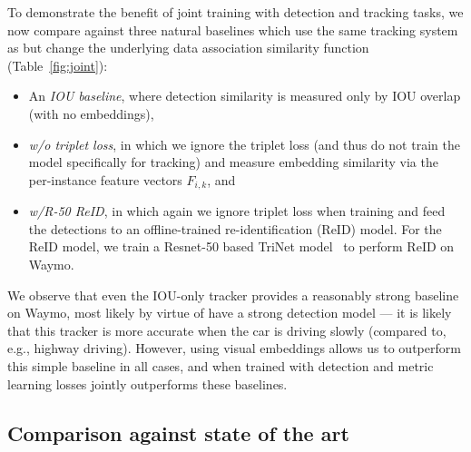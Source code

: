 To demonstrate the benefit of joint training with detection and 
tracking tasks, we now compare \modelname against three natural baselines
which use the same tracking system as \modelname but change the underlying
data association similarity function
(Table~\ref{fig:joint}):
\vspace{-2mm}
\begin{itemize}\denselist
    \item An \emph{IOU baseline}, where  detection similarity
is measured only by IOU overlap  (with no embeddings),
    \item \emph{\modelname w/o triplet loss}, in which we ignore
the triplet loss (and thus do not train the model specifically for tracking) 
and measure
embedding similarity via the per-instance
feature vectors $F_{i,k}$, and
    \item \emph{\modelname w/R-50 ReID}, in which again we ignore
triplet loss when training \modelname and feed the detections
to an offline-trained re-identification (ReID) model. For the ReID model, we train a Resnet-50 based TriNet model~\cite{hermans2017defense} 
to perform ReID on Waymo.
\end{itemize}
We observe that even the IOU-only  tracker provides
a reasonably strong baseline on  Waymo, most likely
by virtue of have a strong detection model --- it is likely
that this tracker is more accurate when the car is driving slowly
(compared to, e.g., highway driving).  However, using visual embeddings allows us to outperform this simple baseline in all cases,
and \modelname when trained with detection and metric learning
losses jointly outperforms these baselines.







      
















\vspace{-2mm}
\subsection{Comparison against state of the art}\label{sec:waymov11}
\vspace{-2mm}








